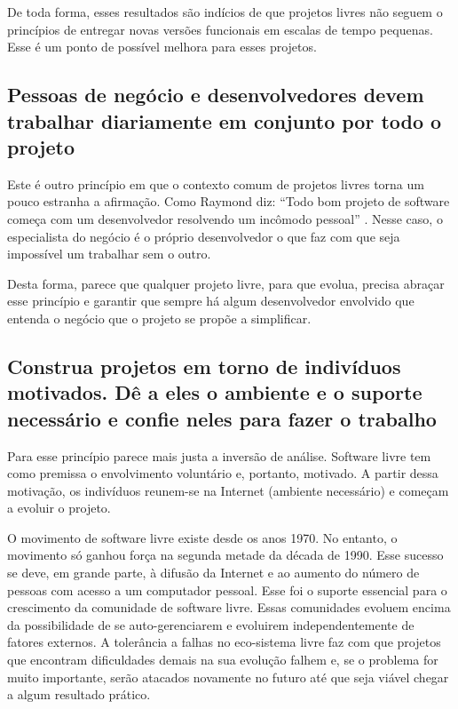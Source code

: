 De toda forma, esses resultados são indícios de que projetos livres
não seguem o princípios de entregar novas versões funcionais em
escalas de tempo pequenas. Esse é um ponto de possível melhora para
esses projetos.

\subsection[Trabalhar com pessoas de negócio]{Pessoas de negócio e
  desenvolvedores devem trabalhar diariamente em conjunto por todo o
  projeto}

Este é outro princípio em que o contexto comum de projetos livres
torna um pouco estranha a afirmação. Como Raymond diz: ``Todo bom
projeto de software começa com um desenvolvedor resolvendo um incômodo
pessoal'' \cite{Raymond1999}. Nesse caso, o especialista do negócio é
o próprio desenvolvedor o que faz com que seja impossível um trabalhar
sem o outro.

Desta forma, parece que qualquer projeto livre, para que evolua,
precisa abraçar esse princípio e garantir que sempre há algum
desenvolvedor envolvido que entenda o negócio que o projeto se propõe
a simplificar.

\subsection[Trabalhe com indivíduos motivados]{ Construa projetos em
  torno de indivíduos motivados.  Dê a eles o ambiente e o suporte
  necessário e confie neles para fazer o trabalho}

Para esse princípio parece mais justa a inversão de análise. Software
livre tem como premissa o envolvimento voluntário e, portanto,
motivado. A partir dessa motivação, os indivíduos reunem-se na
Internet (ambiente necessário) e começam a evoluir o projeto.

O movimento de software livre existe desde os anos 1970. No entanto, o
movimento só ganhou força na segunda metade da década de 1990. Esse
sucesso se deve, em grande parte, à difusão da Internet e ao aumento
do número de pessoas com acesso a um computador pessoal. Esse foi o
suporte essencial para o crescimento da comunidade de software
livre. Essas comunidades evoluem encima da possibilidade de se
auto-gerenciarem e evoluirem independentemente de fatores externos. A
tolerância a falhas no eco-sistema livre faz com que projetos que
encontram dificuldades demais na sua evolução falhem e, se o problema
for muito importante, serão atacados novamente no futuro até que seja
viável chegar a algum resultado prático.

